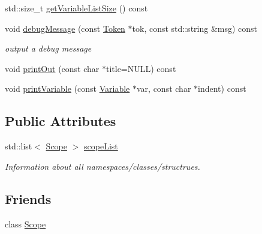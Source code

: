 \begin{DoxyCompactItemize}
\item 
std\-::size\-\_\-t \hyperlink{class_symbol_database_a9a4a4cb4a29eb86afd83182261f4a791}{get\-Variable\-List\-Size} () const 
\item 
void \hyperlink{class_symbol_database_a6c64295a530e66015af1224be35748ec}{debug\-Message} (const \hyperlink{class_token}{Token} $\ast$tok, const std\-::string \&msg) const 
\begin{DoxyCompactList}\small\item\em output a debug message \end{DoxyCompactList}\item 
void \hyperlink{class_symbol_database_a17dc8c675fb94a1a33877ecae1c3e091}{print\-Out} (const char $\ast$title=N\-U\-L\-L) const 
\item 
void \hyperlink{class_symbol_database_aa7c1021f6d151513812e1e7ba04f9c7e}{print\-Variable} (const \hyperlink{class_variable}{Variable} $\ast$var, const char $\ast$indent) const 
\end{DoxyCompactItemize}
\subsection*{Public Attributes}
\begin{DoxyCompactItemize}
\item 
std\-::list$<$ \hyperlink{class_scope}{Scope} $>$ \hyperlink{class_symbol_database_ac61e640cbcf50a61d2880f80f6bcd8d1}{scope\-List}
\begin{DoxyCompactList}\small\item\em Information about all namespaces/classes/structrues. \end{DoxyCompactList}\end{DoxyCompactItemize}
\subsection*{Friends}
\begin{DoxyCompactItemize}
\item 
class \hyperlink{class_symbol_database_a921193447f6e42f596ac0a7694b02830}{Scope}
\end{DoxyCompactItemize}


